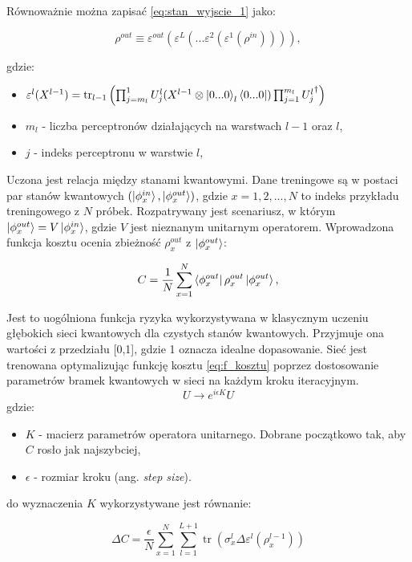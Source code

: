 Równoważnie można zapisać \ref{eq:stan_wyjscie_1} jako:

\begin{equation}\label{eq:stan_wyjscie_2}
    \rho^{out} \equiv \varepsilon^{out}(\varepsilon^L(...\varepsilon^2(\varepsilon^1(\rho^{in})))),
\end{equation}

gdzie:
\begin{itemize}
    \item $\varepsilon^l(X^{l-1}) = \operatorname{tr}_{l-1} \left(\prod_{j=m_l}^1 U_j^l (X^{l-1}\otimes\ket{0...0}_l\bra{0...0})\prod_{j=1}^{m_l}{U_j^l}^{\dagger}  \right)$
    \item $m_l$ - liczba perceptronów działających na warstwach $l-1$ oraz $l$,
    \item $j$ - indeks perceptronu w warstwie $l$,
\end{itemize}

Uczona jest relacja między stanami kwantowymi. Dane treningowe są w postaci par stanów kwantowych $(\ket{\phi_x^{in}},\ket{\phi_x^{out}})$, gdzie $x = 1,2,...,N$ to indeks przykładu treningowego z $N$ próbek. Rozpatrywany jest scenariusz, w którym $\ket{\phi_x^{out}}=V\ket{\phi_x^{in}}$, gdzie $V$ jest nieznanym unitarnym operatorem. 
Wprowadzona funkcja kosztu ocenia zbieżność $\rho_x^{out}$ z $\ket{\phi_x^{out}}$:

\begin{equation}\label{eq:f_kosztu}
    C = \frac{1}{N} \sum_{x=1}^{N} \bra{\phi_x^{out}} \rho_x^{out} \ket{\phi_x^{out}},
\end{equation}

Jest to uogólniona funkcja ryzyka wykorzystywana w klasycznym uczeniu głębokich sieci kwantowych dla czystych stanów kwantowych. Przyjmuje ona wartości z przedziału [0,1], gdzie 1 oznacza idealne dopasowanie. 
Sieć jest trenowana optymalizując funkcję kosztu \ref{eq:f_kosztu} poprzez dostosowanie parametrów bramek kwantowych w sieci na każdym kroku iteracyjnym. 
\[U \rightarrow e^{i\epsilon K}U\]
gdzie:
\begin{itemize}
    \item $K$ - macierz parametrów operatora unitarnego. Dobrane początkowo tak, aby $C$ rosło jak najszybciej,
    \item $\epsilon$ - rozmiar kroku (ang. \textit{step size}).
\end{itemize}
do wyznaczenia $K$ wykorzystywane jest równanie:

\begin{equation}\label{eq:delta_C}
    \Delta C = \frac{\epsilon}{N}\sum_{x=1}^{N}\sum_{l=1}^{L+1}\operatorname{tr}(\sigma_x^l\Delta\varepsilon^l(\rho_x^{l-1}))
\end{equation}

